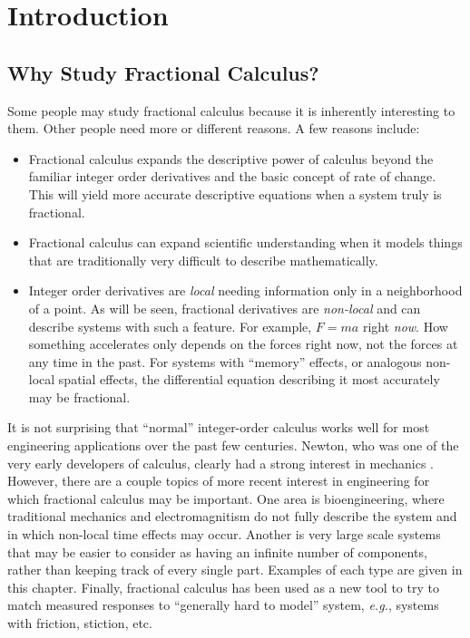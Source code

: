 \chapter{Introduction}

\section{Why Study Fractional Calculus?}
Some people may study fractional calculus because it is inherently interesting to them. Other people need more or different reasons. A few reasons include:
\begin{itemize}
  \item Fractional calculus expands the descriptive power of calculus beyond the familiar integer order derivatives and the basic concept of rate of change. This will yield more accurate descriptive equations when a system truly is fractional.
  \item Fractional calculus can expand scientific understanding when it models things that are traditionally very difficult to describe mathematically.
  \item Integer order derivatives are \emph{local} needing information only in a neighborhood of a point. As will be seen, fractional derivatives are \emph{non-local} and can describe systems with such a feature. For example, $F=ma$ right \emph{now}. How something accelerates only depends on the forces right now, not the forces at any time in the past. For systems with ``memory'' effects, or analogous non-local spatial effects, the differential equation describing it most accurately may be fractional.
\end{itemize}

It is not surprising that ``normal'' integer-order calculus works well for most engineering applications over the past few centuries. Newton, who was one of the very early developers of calculus, clearly had a strong interest in mechanics \cite{principia}. However, there are a couple topics of more recent interest in engineering for which fractional calculus may be important. One area is bioengineering, where traditional mechanics and electromagnitism do not fully describe the system and in which non-local time effects may occur. Another is very large scale systems that may be easier to consider as having an infinite number of components, rather than keeping track of every single part. Examples of each type are given in this chapter.  Finally, fractional calculus has been used as a new tool to try to match measured responses to ``generally hard to model'' system, \textit{e.g.}, systems with friction, stiction, etc. 

